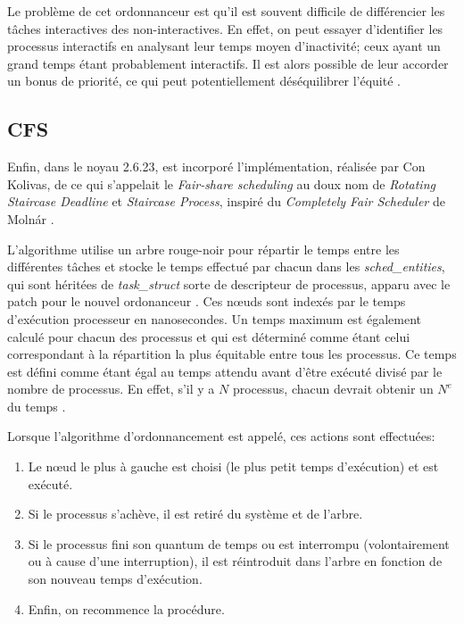 \documentclass[letterpaper]{article}
\begin{document}
Le problème de cet ordonnanceur est qu'il est souvent difficile de différencier les tâches interactives des non-interactives. En effet, on peut essayer d'identifier les processus interactifs en analysant leur temps moyen d'inactivité; ceux ayant un grand temps étant probablement interactifs. Il est alors possible de leur accorder un bonus de priorité, ce qui peut potentiellement déséquilibrer l'équité \citep{4631872}.

\subsection{CFS}

Enfin, dans le noyau 2.6.23, est incorporé l'implémentation, réalisée par Con Kolivas, de ce qui s'appelait le \textit{Fair-share scheduling} au doux nom de \textit{Rotating Staircase Deadline} et \textit{Staircase Process}, inspiré du \textit{Completely Fair Scheduler} de Molnár \citep{PATCHCFS}.

L'algorithme utilise un arbre rouge-noir \citep{lozi2016linux} pour répartir le temps entre les différentes tâches et stocke le temps effectué par chacun dans les \textit{sched\_entities}, qui sont héritées de \textit{task\_struct} sorte de descripteur de processus, apparu avec le patch pour le nouvel ordonanceur \citep{Pabla:2009:CFS:1594371.1594375}. Ces nœuds sont indexés par le temps d'exécution processeur en nanosecondes. Un temps maximum est également calculé pour chacun des processus et qui est déterminé comme étant celui correspondant à la répartition la plus équitable entre tous les processus. Ce temps est défini comme étant égal au temps attendu avant d'être exécuté divisé par le nombre de processus. En effet, s'il y a $N$ processus, chacun devrait obtenir un $N^{e}$ du temps \citep{IllustrationCFSusingAATree}.

Lorsque l'algorithme d'ordonnancement est appelé, ces actions sont effectuées:

\begin{enumerate}
\item Le nœud le plus à gauche est choisi (le plus petit temps d'exécution) et est exécuté.
\item Si le processus s'achève, il est retiré du système et de l'arbre.
\item Si le processus fini son quantum de temps ou est interrompu (volontairement ou à cause d'une interruption), il est réintroduit dans l'arbre en fonction de son nouveau temps d'exécution.
\item Enfin, on recommence la procédure.
\end{enumerate}
\end{document}
